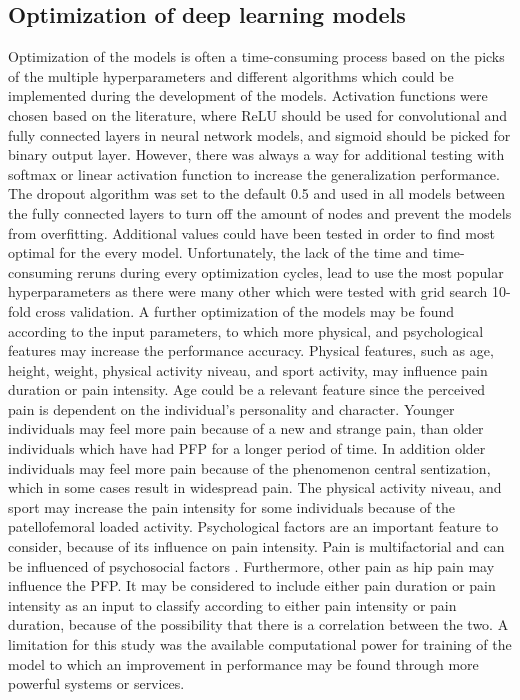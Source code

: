 \subsection*{Optimization of deep learning models}
Optimization of the models is often a time-consuming process based on the picks of the multiple hyperparameters and different algorithms which could be implemented during the development of the models.  
Activation functions were chosen based on the literature, where ReLU should be used for convolutional and fully connected layers in neural network models, and sigmoid should be picked for binary output layer. However, there was always a way for additional testing with softmax or linear activation function to increase the generalization performance. 
The dropout algorithm was set to the default 0.5 and used in all models between the fully connected layers to turn off the amount of nodes and prevent the models from overfitting. Additional values could have been tested in order to find most optimal for the every model.
Unfortunately, the lack of the time and time-consuming reruns during every optimization cycles, lead to use the most popular hyperparameters as there were many other which were tested with grid search 10-fold cross validation.
A further optimization of the models may be found according to the input parameters, to which more physical, and psychological features may increase the performance accuracy. Physical features, such as age, height, weight, physical activity niveau, and sport activity, may influence pain duration or pain intensity. Age could be a relevant feature since the perceived pain is dependent on the individual’s personality and character. Younger individuals may feel more pain because of a new and strange pain, than older individuals which have had PFP for a longer period of time. In addition older individuals may feel more pain because of the phenomenon central sentization, which in some cases result in widespread pain. The physical activity niveau, and sport may increase the pain intensity for some individuals because of the patellofemoral loaded activity. Psychological factors are an important feature to consider, because of its influence on pain intensity. Pain is multifactorial and can be influenced of psychosocial factors \citep{Roos2003}. Furthermore, other pain as hip pain may influence the PFP.
It may be considered to include either pain duration or pain intensity as an input to classify according to either pain intensity or pain duration, because of the possibility that there is a correlation between the two.
A limitation for this study was the available computational power for training of the model to which an improvement in performance may be found through more powerful systems or services.
